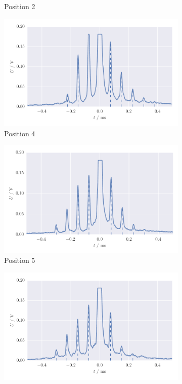 \begin{figure}[H]
\begin{subfigure}[b]{\mpltw}
        \caption{Position 2}
        \label{}
    \end{subfigure}
    \begin{subfigure}[b]{\mpltw}
        \includegraphics[width=\textwidth]{figures/aperture_4b}
        \caption{Position 4}
        \label{}
    \end{subfigure}
    \begin{subfigure}[b]{\mpltw}
        \includegraphics[width=\textwidth]{figures/aperture_5b}
        \caption{Position 5}
        \label{}
    \end{subfigure}
    \begin{subfigure}[b]{\mpltw}
        \includegraphics[width=\textwidth]{figures/aperture_6b}

\end{subfigure}
\end{figure}
